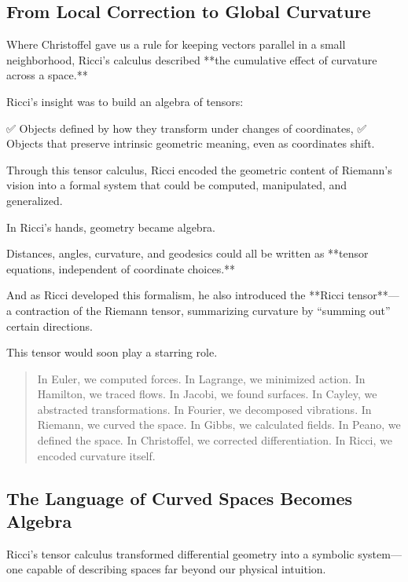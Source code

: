 \bigskip

\subsection*{From Local Correction to Global Curvature}

Where Christoffel gave us a rule for keeping vectors parallel in a small neighborhood,  
Ricci’s calculus described **the cumulative effect of curvature across a space.**

Ricci’s insight was to build an algebra of tensors:

✅ Objects defined by how they transform under changes of coordinates,  
✅ Objects that preserve intrinsic geometric meaning, even as coordinates shift.

Through this tensor calculus, Ricci encoded the geometric content of Riemann’s vision into a formal system that could be computed, manipulated, and generalized.

\bigskip

In Ricci’s hands, geometry became algebra.

Distances, angles, curvature, and geodesics could all be written as **tensor equations, independent of coordinate choices.**

And as Ricci developed this formalism, he also introduced the **Ricci tensor**—a contraction of the Riemann tensor, summarizing curvature by “summing out” certain directions.

This tensor would soon play a starring role.

\bigskip

\begin{quote}
In Euler, we computed forces.  
In Lagrange, we minimized action.  
In Hamilton, we traced flows.  
In Jacobi, we found surfaces.  
In Cayley, we abstracted transformations.  
In Fourier, we decomposed vibrations.  
In Riemann, we curved the space.  
In Gibbs, we calculated fields.  
In Peano, we defined the space.  
In Christoffel, we corrected differentiation.  
In Ricci, we encoded curvature itself.
\end{quote}

\subsection*{The Language of Curved Spaces Becomes Algebra}

Ricci’s tensor calculus transformed differential geometry into a symbolic system—  
one capable of describing spaces far beyond our physical intuition.

